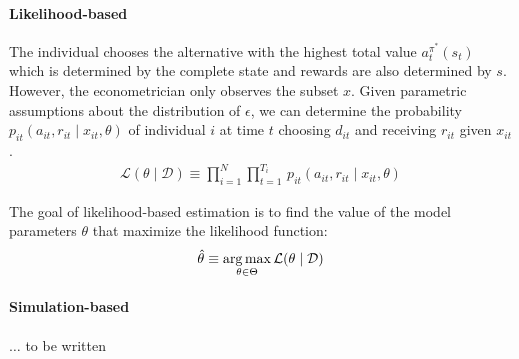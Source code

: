 \paragraph{Likelihood-based} The individual chooses the alternative with the highest total value $a_t^{\pi^*}(s_t)$ which is determined by the complete state and rewards are also determined by $s$. However, the econometrician only observes the subset $x$. Given parametric assumptions about the distribution of $\epsilon$, we can determine the probability $p_{it}(a_{it}, r_{it} \mid x_{it}, \theta)$ of individual $i$ at time $t$ choosing $d_{it}$ and receiving $r_{it}$ given $x_{it}$.
%
\begin{align*}
  \mathcal{L}(\theta\mid\mathcal{D}) \equiv \prod^N_{i= 1} \prod^{T_i}_{t= 1}\, p_{it}(a_{it}, r_{it} \mid x_{it}, \theta)
\end{align*}

\noindent The goal of likelihood-based estimation is to find the value of the model parameters $\theta$ that maximize the likelihood function:
%
\begin{align*}
\hat{\theta} \equiv \operatorname*{arg\,max}_{\theta \in \Theta} \mathcal{L}(\theta\mid\mathcal{D})
\end{align*}

\paragraph{Simulation-based} $\hdots$ to be written
